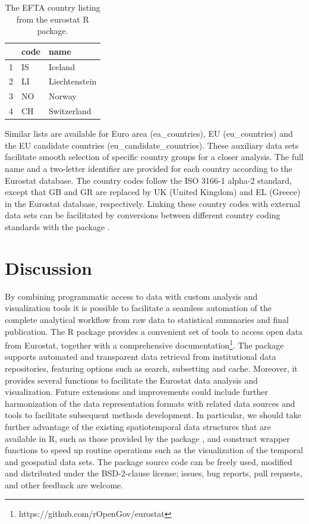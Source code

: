 \begin{table}[h]
\centering
\begin{tabular}{rll}
\toprule
  \hline
  & code & name \\ 
  \hline
  1 & IS & Iceland \\ 
  2 & LI & Liechtenstein \\ 
  3 & NO & Norway \\ 
  4 & CH & Switzerland \\ 
   \hline
\bottomrule   
\end{tabular}
\caption{The EFTA country listing from the eurostat R package.}
\label{tab:efta}
\end{table}

Similar lists are available for Euro area (ea\_countries), EU
(eu\_countries) and the EU candidate countries
(eu\_candidate\_countries). These auxiliary data sets facilitate
smooth selection of specific country groups for a closer analysis. The
full name and a two-letter identifier are provided for each country
according to the Eurostat database. The country codes follow the ISO
3166-1 alpha-2 standard, except that GB and GR are replaced by UK
(United Kingdom) and EL (Greece) in the Eurostat database,
respectively. Linking these country codes with external data sets can
be facilitated by conversions between different country coding
standards with the  package \citep{countrycode}.




\section{Discussion}

By combining programmatic access to data with custom analysis and
visualization tools it is possible to facilitate a seamless automation
of the complete analytical workflow from raw data to statistical
summaries and final publication. The  R package
provides a convenient set of tools to access open data from Eurostat,
together with a comprehensive
documentation\footnote{https://github.com/rOpenGov/eurostat}. The package
supports automated and transparent data retrieval from institutional
data repositories, featuring options such as search, subsetting and
cache. Moreover, it provides several functions to facilitate the
Eurostat data analysis and visualization. Future extensions and
improvements could include further harmonization of the data
representation formats with related data sources and tools to
facilitate subsequent methods development. In particular, we should
take further advantage of the existing spatiotemporal data structures
that are available in R, such as those provided by
the  package \citep{spacetime}, and construct
wrapper functions to speed up routine operations such as the
visualization of the temporal and geospatial data sets. The package
source code can be freely used, modified and distributed under the
BSD-2-clause license; issues, bug reports, pull requests, and other
feedback are welcome.


